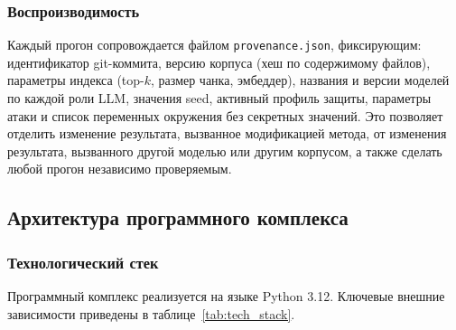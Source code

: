 \documentclass[12pt, a4paper]{article}
\theoremstyle{definition}
\theoremstyle{remark}
\begin{document}
\subsubsection{Воспроизводимость}

Каждый прогон сопровождается файлом \texttt{provenance.json}, фиксирующим: идентификатор git-коммита, версию корпуса (хеш по содержимому файлов), параметры индекса (top-$k$, размер чанка, эмбеддер), названия и версии моделей по каждой роли LLM, значения seed, активный профиль защиты, параметры атаки и список переменных окружения без секретных значений. Это позволяет отделить изменение результата, вызванное модификацией метода, от изменения результата, вызванного другой моделью или другим корпусом, а также сделать любой прогон независимо проверяемым.

\subsection{Архитектура программного комплекса}
\label{sec:software_architecture}

\subsubsection{Технологический стек}

Программный комплекс реализуется на языке Python 3.12. Ключевые внешние зависимости приведены в таблице~\ref{tab:tech_stack}.
\end{document}
